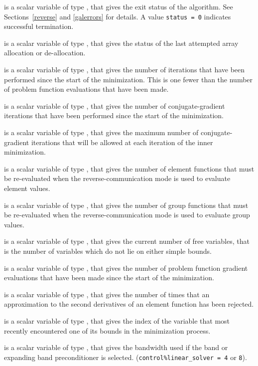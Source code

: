 \documentclass{galahad}
\begin{document}
\begin{description}
 is a scalar variable of type \integer, that gives the
exit status of the algorithm. See Sections~\ref{reverse} and
\ref{galerrors} for details. A value {\tt status = 0} indicates
successful termination.

 is a scalar variable of type \integer, that gives
the status of the last attempted array allocation or de-allocation.

 is a scalar variable of type \integer, that gives
the number of iterations that have been performed since the start of the
minimization. This is one fewer than the number of
problem function evaluations that have been made.

 is a scalar variable of type \integer, that gives
the number of conjugate-gradient iterations that have
been performed since the start of the minimization.

 is a scalar variable of type \integer, that gives
the maximum number of conjugate-gradient iterations that will be allowed
at each iteration of the inner minimization.

 is a scalar variable of type \integer, that gives
the number of element functions that must be re-evaluated when the
reverse-communication mode is used to evaluate element values.

 is a scalar variable of type \integer, that gives
the number of group functions that must be re-evaluated when the
reverse-communication mode is used to evaluate group values.

 is a scalar variable of type \integer, that gives
the current number of free variables, that is the number of variables
which do not lie on either simple bounds.

 is a scalar variable of type \integer, that gives
the number of problem function gradient evaluations that have
been made since the start of the minimization.

 is a scalar variable of type \integer, that gives
the number of times that an approximation to the
second derivatives of an element function has been rejected.

 is a scalar variable of type \integer, that gives
the index of the variable that most recently
encountered one of its bounds in the minimization process.

 is a scalar variable of type \integer, that gives
the bandwidth used if the band
or expanding band preconditioner is selected.
({\tt control\%linear\_solver = 4} or {\tt 8}).


\end{description}
\end{document}
